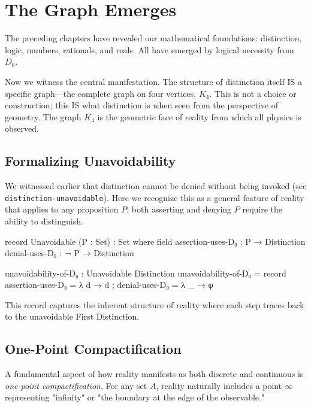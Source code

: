 \documentclass[11pt,a4paper]{book}
\begin{document}
\chapter{The Graph Emerges}
\label{chap:graph-emerges}

The preceding chapters have revealed our mathematical foundations: distinction, logic, 
numbers, rationals, and reals. All have emerged by logical necessity from $D_0$.

Now we witness the central manifestation. The structure of distinction itself IS 
a specific graph—the complete graph on four vertices, $K_4$. This is not a choice 
or construction; this IS what distinction is when seen from the perspective of 
geometry. The graph $K_4$ is the geometric face of reality from which all physics 
is observed.

\section{Formalizing Unavoidability}

We witnessed earlier that distinction cannot be denied without being invoked 
(see \texttt{distinction-unavoidable}). Here we recognize this as a general 
feature of reality that applies to any proposition $P$: both asserting 
and denying $P$ require the ability to distinguish.

\begin{code}
record Unavoidable (P : Set) : Set where
  field
    assertion-uses-D₀ : P → Distinction
    denial-uses-D₀    : ¬ P → Distinction

unavoidability-of-D₀ : Unavoidable Distinction
unavoidability-of-D₀ = record
  { assertion-uses-D₀ = λ d → d
  ; denial-uses-D₀    = λ _ → φ
  }
\end{code}

This record captures the inherent structure of reality where each step 
traces back to the unavoidable First Distinction.

\section{One-Point Compactification}

A fundamental aspect of how reality manifests as both discrete and continuous is 
\emph{one-point compactification}. For any set $A$, reality naturally includes 
a point $\infty$ representing "infinity" or "the boundary at the edge of 
the observable."
\end{document}
